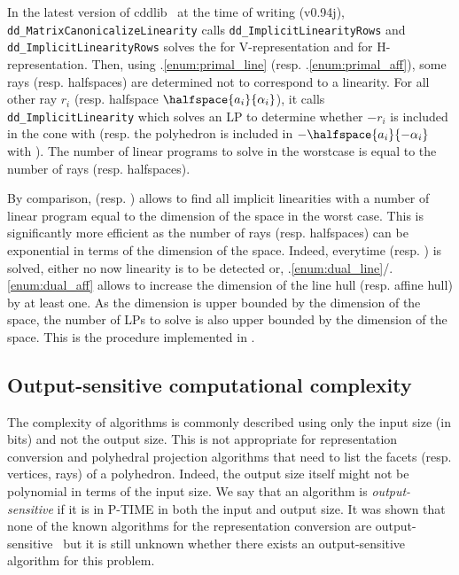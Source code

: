 \documentclass[11pt,twoside,a4paper,openright]{uclouvain-thesis}
\begin{document}
\begin{myrem}
  \label{rem:cddlibaff}
  In the latest version of cddlib~\cite{fukuda2003cdd} at the time of writing (v0.94j),
  \texttt{dd\_MatrixCanonicalizeLinearity} calls
  \texttt{dd\_ImplicitLinearityRows} and \texttt{dd\_ImplicitLinearityRows}
  solves the  for V-representation and 
  for H-representation.
  Then, using .\ref{enum:primal_line} (resp. .\ref{enum:primal_aff}),
  some rays (resp. halfspaces) are determined not to correspond to a linearity.
  For all other ray $r_i$ (resp. halfspace $\halfspace{a_i}{\alpha_i}$), it calls
  \texttt{dd\_ImplicitLinearity} which solves an LP
  to determine whether $-r_i$ is included in the cone with  (resp. the polyhedron is included in $-\halfspace{a_i}{-\alpha_i}$ with ).
  The number of linear programs to solve in the worstcase is equal to the number of rays (resp. halfspaces).

  By comparison,  (resp. ) allows to find all implicit linearities with a number of linear program equal to the dimension of the space in the worst case.
  This is significantly more efficient as the number of rays (resp. halfspaces) can be exponential
  in terms of the dimension of the space.
  Indeed, everytime  (resp. ) is solved,
  either no now linearity is to be detected or,
  .\ref{enum:dual_line}/.\ref{enum:dual_aff}
  allows to increase the dimension of the line hull (resp. affine hull)
  by at least one.
  As the dimension is upper bounded by the dimension of the space, the number of
  LPs to solve is also upper bounded by the dimension of the space.
  This is the procedure implemented in .
\end{myrem}

\subsection{Output-sensitive computational complexity}
The complexity of algorithms is commonly described using only the input size (in bits) and not the output size.
This is not appropriate for representation conversion and polyhedral projection algorithms that need to list the facets (resp. vertices, rays) of a polyhedron.
Indeed, the output size itself might not be polynomial in terms of the input size.
We say that an algorithm is \emph{output-sensitive} if it is in P-TIME in both the input and output size.
It was shown that none of the known algorithms for the representation conversion are output-sensitive~\cite{avis1995good} but
it is still unknown whether there exists an output-sensitive algorithm for this problem.
\end{document}
